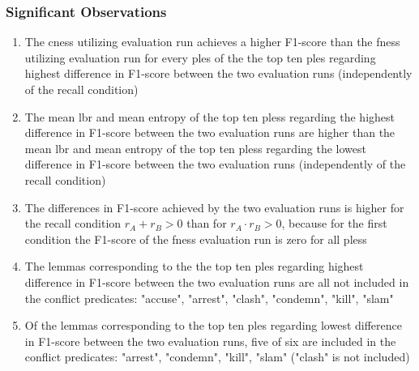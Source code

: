 \documentclass[11pt, numbers=noenddot]{scrreprt}
\newcounter{listcounter}
\begin{document}
\subsubsection{Significant Observations}
\begin{enumerate}[label=\arabic{listcounter}.\arabic*]
	\item The \gls{cness} utilizing evaluation run achieves a higher F1-score than the \gls{fness} utilizing evaluation run for every \gls{ples} of the the top ten \gls{ples} regarding highest difference in F1-score between the two evaluation runs (independently of the recall condition) \label{obs-itm:cness-higher-f1-for-highest-f1-difference}
	\item The mean \gls{lbr} and mean entropy of the top ten \gls{ples}s regarding the highest difference in F1-score between the two evaluation runs are higher than the mean \gls{lbr} and mean entropy of the top ten \gls{ples}s regarding the lowest difference in F1-score between the two evaluation runs (independently of the recall condition) \label{obs-itm:ples-more-diverse-for-highest-f1-difference}
	\item The differences in F1-score achieved by the two evaluation runs is higher for the recall condition \(r_A + r_B > 0\) than for \(r_A \cdot r_B > 0\), because for the first condition the F1-score of the \gls{fness} evaluation run is zero for all \gls{ples}s \label{obs-itm:fness-zero-recall-highest-f1-difference}
	\item The lemmas corresponding to the the top ten \gls{ples} regarding highest difference in F1-score between the two evaluation runs are all not included in the conflict predicates: "accuse", "arrest", "clash", "condemn", "kill", "slam" \label{obs-itm:conflict-verbs-not-in-highest-f1-difference}
	\item Of the lemmas corresponding to  the top ten \gls{ples} regarding lowest difference in F1-score between the two evaluation runs, five of six are included in the conflict predicates: "arrest", "condemn", "kill", "slam" ("clash" is not included) \label{obs-itm:conflict-verbs-in-lowest-f1-difference}

\end{enumerate}
\end{document}

